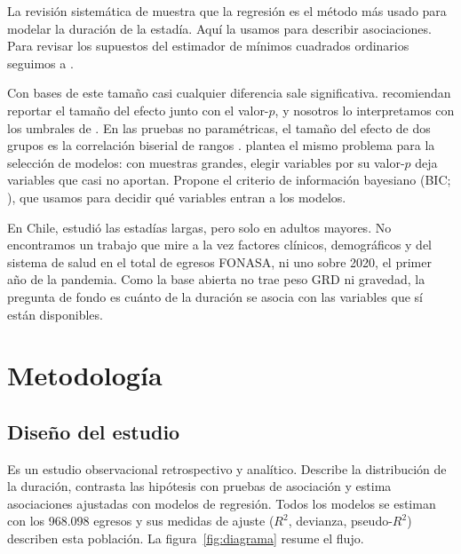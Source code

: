 \documentclass[10.5pt,a4paper,headings=small,abstract=false]{scrartcl}
\begin{document}
La revisión sistemática de \citet{lequertier2021} muestra que la regresión es el método más usado para modelar la duración de la estadía. Aquí la usamos para describir asociaciones. Para revisar los supuestos del estimador de mínimos cuadrados ordinarios seguimos a \citet{rodriguez2017}.

Con bases de este tamaño casi cualquier diferencia sale significativa. \citet{lin2013} recomiendan reportar el tamaño del efecto junto con el valor-$p$, y nosotros lo interpretamos con los umbrales de \citet{cohen1988}. En las pruebas no paramétricas, el tamaño del efecto de dos grupos es la correlación biserial de rangos \citep{kerby2014}. \citet{raftery1995} plantea el mismo problema para la selección de modelos: con muestras grandes, elegir variables por su valor-$p$ deja variables que casi no aportan. Propone el criterio de información bayesiano (BIC; \citealt{schwarz1978}), que usamos para decidir qué variables entran a los modelos.

En Chile, \citet{olivares2020} estudió las estadías largas, pero solo en adultos mayores. No encontramos un trabajo que mire a la vez factores clínicos, demográficos y del sistema de salud en el total de egresos FONASA, ni uno sobre 2020, el primer año de la pandemia. Como la base abierta no trae peso GRD ni gravedad, la pregunta de fondo es cuánto de la duración se asocia con las variables que sí están disponibles.

\section{Metodología}

\subsection{Diseño del estudio}

Es un estudio observacional retrospectivo y analítico. Describe la distribución de la duración, contrasta las hipótesis con pruebas de asociación y estima asociaciones ajustadas con modelos de regresión. Todos los modelos se estiman con los 968.098 egresos y sus medidas de ajuste ($R^2$, devianza, pseudo-$R^2$) describen esta población. La figura~\ref{fig:diagrama} resume el flujo.
\end{document}
